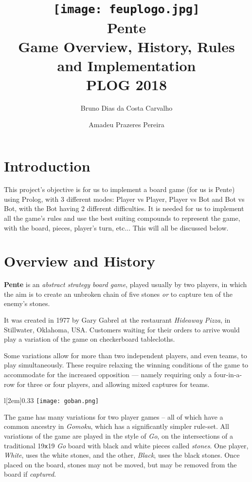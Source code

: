 \documentclass[12pt,a4paper,notitlepage]{article}
\title{
	\vspace{-2\baselineskip}
	\texttt{[image: feuplogo.jpg]}\\
	{\Huge Pente}\\
	{\Large Game Overview, History, Rules and Implementation}\\
	{\normalsize PLOG 2018}
}
\author{
	Bruno Dias da Costa Carvalho\hspace*{1.5em}\text{up201606517}
	\and
	Amadeu Prazeres Pereira\hspace*{1.5em}\text{up201605646} 
}
\newcommand*{\boardsize}[1]{#1\texttt{x}#1}
\begin{document}
\maketitle
\thispagestyle{empty}

\section{Introduction}
\label{sec:introduction}

This project's objective is for us to implement a board game (for us is Pente) using Prolog, with 3 different modes: Player vs Player, Player vs Bot and Bot vs Bot, with the Bot having 2 different difficulties.
  It is needed for us to implement all the game's rules and use the best suiting compounds to represent the game, with the board, pieces, player's turn, etc...
This will all be discussed below.

\section{Overview and History}
\label{sec:overview}

\textbf{Pente} is an \textit{abstract strategy board game}, played usually by two players, in which the aim is to create an unbroken chain of five stones \emph{or} to capture ten of the enemy's stones.

It was created in 1977 by Gary Gabrel at the restaurant \textsl{Hideaway Pizza}, in Stillwater, Oklahoma, USA.\supercite{pente-wikipedia}
Customers waiting for their orders to arrive would play a variation of the game on checkerboard tablecloths.\supercite{pente-wikipedia}

Some variations allow for more than two independent players, and even teams, to play simultaneously. These require relaxing the winning conditions of the game to accommodate for the increased opposition --- namely requiring only a four-in-a-row for three or four players, and allowing mixed captures for teams.\supercite{pente-winning-moves}

\begin{wrapfigure}[12]{l}[2em]{0.33\textwidth}
	\vspace*{-1\baselineskip}
	\texttt{[image: goban.png]}
	\caption{\boardsize{19} \textit{Go} board. \label{fig:goban}}
\end{wrapfigure}

The game has many variations for two player games -- all of which have a common ancestry in \textit{Gomoku}, which has a significantly simpler rule-set.
All variations of the game are played in the style of \textit{Go}, on the intersections of a traditional \boardsize{19} \emph{Go} board with black and white pieces called \emph{stones}. One player, \textsl{White}, uses the white stones, and the other, \textsl{Black}, uses the black stones. Once placed on the board, stones may not be moved, but may be removed from the board if \emph{captured}.
\end{document}
